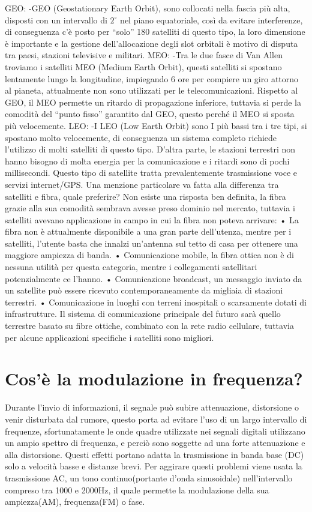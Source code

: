 GEO:
-GEO (Geostationary Earth Orbit), sono collocati nella fascia più alta, disposti con un intervallo di $2^{\circ}$ nel piano equatoriale, così da evitare interferenze, di conseguenza c’è posto per “solo” 180 satelliti di questo tipo, la loro dimensione è importante e la gestione dell’allocazione degli slot orbitali è motivo di disputa tra paesi, stazioni televisive e militari.
MEO:
-Tra le due fasce di Van Allen troviamo i satelliti MEO (Medium Earth Orbit), questi satelliti si spostano lentamente lungo la longitudine, impiegando 6 ore per compiere un giro attorno al pianeta, attualmente non sono utilizzati per le telecomunicazioni. Rispetto al GEO, il MEO permette un ritardo di propagazione inferiore, tuttavia si perde la comodità del “punto fisso” garantito dal GEO, questo perché il MEO si sposta più velocemente.
LEO:
-I LEO (Low Earth Orbit) sono I più bassi tra i tre tipi, si spostano molto velocemente, di conseguenza un sistema completo richiede l’utilizzo di molti satelliti di questo tipo. D’altra parte, le stazioni terrestri non hanno bisogno di molta energia per la comunicazione e i ritardi sono di pochi millisecondi.
Questo tipo di satellite tratta prevalentemente trasmissione voce e servizi internet/GPS.
Una menzione particolare va fatta alla differenza tra satelliti e fibra, quale preferire? 
Non esiste una risposta ben definita, la fibra grazie alla sua comodità sembrava avesse preso dominio nel mercato, tuttavia i satelliti avevano applicazione in campo in cui la fibra non poteva arrivare:
•	La fibra non è attualmente disponibile a una gran parte dell’utenza, mentre per i satelliti, l’utente basta che innalzi un’antenna sul tetto di casa per ottenere una maggiore ampiezza di banda.
•	Comunicazione mobile, la fibra ottica non è di nessuna utilità per questa categoria, mentre i collegamenti satellitari potenzialmente ce l’hanno.
•	Comunicazione broadcast, un messaggio inviato da un satellite può essere ricevuto contemporaneamente da migliaia di stazioni terrestri.
•	Comunicazione in luoghi con terreni inospitali o scarsamente dotati di infrastrutture.
Il sistema di comunicazione principale del futuro sarà quello terrestre basato su fibre ottiche, combinato con la rete radio cellulare, tuttavia per alcune applicazioni specifiche i satelliti sono migliori.
\section{Cos’è la modulazione in frequenza?}

Durante l’invio di informazioni, il segnale può subire attenuazione, distorsione o venir disturbata dal rumore, questo porta ad evitare l’uso di un largo intervallo di frequenze, sfortunatamente le onde quadre utilizzate nei segnali digitali utilizzano un ampio spettro di frequenza, e perciò sono soggette ad una forte attenuazione e alla distorsione.
Questi effetti portano adatta la trasmissione in banda base (DC) solo a velocità basse e distanze brevi.
Per aggirare questi problemi viene usata la trasmissione AC, un tono continuo(portante d’onda sinusoidale) nell’intervallo compreso tra 1000 e 2000Hz, il quale permette la modulazione della sua ampiezza(AM), frequenza(FM) o fase.
 
